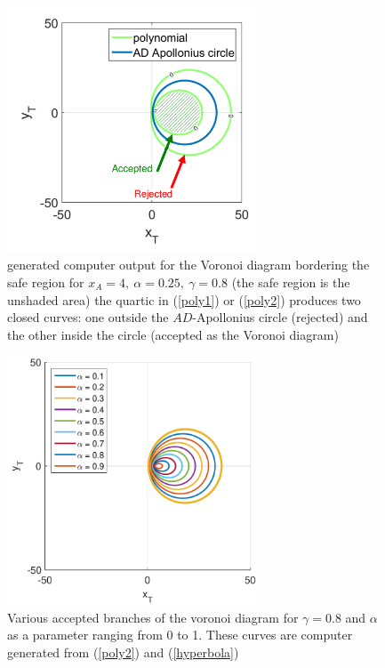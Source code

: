 \begin{figure}[htb]
\centering
\includegraphics[width=0.66\textwidth]{fig/marked_circle_curve_g_0p8.pdf}
\caption{generated computer output for the Voronoi diagram bordering the safe region for $x_A=4,\ \alpha=0.25,\ \gamma=0.8$ (the safe region is the unshaded area) the quartic in (\ref{poly1}) or (\ref{poly2}) produces two closed curves: one outside the $AD$-Apollonius circle (rejected) and the other inside the circle (accepted as the Voronoi diagram)}
\label{gamma=0.8}
\end{figure}


\begin{figure}[htb]
\centering
\includegraphics[width=0.66\textwidth]{fig/VAR_alpha_g_0p8.pdf}
\caption{Various accepted branches of the voronoi diagram for $\gamma=0.8$ and $\alpha$ as a parameter ranging from 0 to 1. These curves are computer generated from (\ref{poly2}) and (\ref{hyperbola})}
\label{VAR_alpha_gamma=0.8}
\end{figure}


